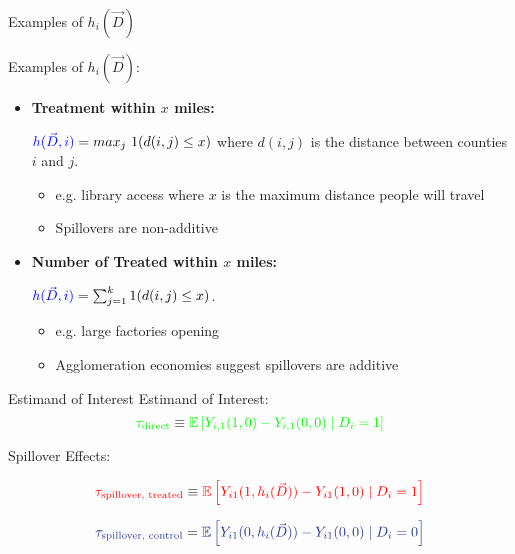 \documentclass[aspectratio=169]{beamer}
\begin{document}

\begin{frame}{Examples of $h_i(\vec{D})$}
    
    Examples of $h_i(\vec{D})$:
    
    \begin{itemize}
        \item \textbf{Treatment within $x$ miles:}
        
        $\textcolor{blue}{h(\vec{D}, i)} = max_j \ 1(d(i, j) \leq x)$ where $d(i,j)$ is the distance between counties $i$ and $j$. 

        \begin{itemize}
            \item e.g. library access where $x$ is the maximum distance people will travel
            
            \item Spillovers are non-additive
        \end{itemize}
        
        \vspace{2.5mm}
        \item \textbf{Number of Treated within $x$ miles:}
        
        $\textcolor{blue}{h(\vec{D}, i)} = \sum_{j = 1}^k 1(d(i, j) \leq x)$. 

        \begin{itemize}
            \item e.g. large factories opening
            
            \item Agglomeration economies suggest spillovers are additive
        \end{itemize}

    \end{itemize}
\end{frame}




\begin{frame}{Estimand of Interest}
    Estimand of Interest: 
    \[ 
        \textcolor{green}{\tau_{\text{direct}}} \equiv \textcolor{green}{\mathbb{E}\left[ Y_{i,1}(1, 0) - Y_{i,1}(0, 0) \mid D_i = 1\right]}
    \]


    \pause
    \vspace{2.5mm}
    Spillover Effects:

    \[
        \textcolor{red}{\tau_{\text{spillover, treated}}} \equiv \textcolor{red}{\mathbb{E} \left[ Y_{i1}(1, h_i(\vec{D})) - Y_{i1}(1, 0) \mid D_i = 1 \right]}
    \]

    \[ 
        \textcolor{purple}{\tau_{\text{spillover, control}}} = \textcolor{purple}{\mathbb{E} \left[ Y_{i1}(0, h_i(\vec{D})) - Y_{i1}(0, 0) \mid D_i = 0 \right]}
    \]
\end{frame}
\end{document}
